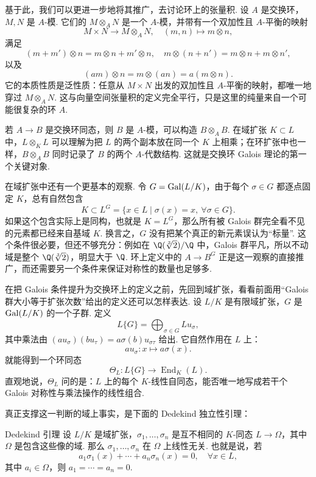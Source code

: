基于此，我们可以更进一步地将其推广，去讨论环上的张量积. 设 $A$ 是交换环，$M,N$ 是 $A$-模. 它们的 $M\otimes_A N$ 是一个 $A$-模，并带有一个双加性且 $A$-平衡的映射
\[
    M\times N\to M\otimes_A N,\quad (m,n)\mapsto m\otimes n,
\]
满足
\[
    (m+m')\otimes n=m\otimes n+m'\otimes n,\quad
    m\otimes(n+n')=m\otimes n+m\otimes n',
\]
以及
\[
    (am)\otimes n=m\otimes(an)=a(m\otimes n).
\]
它的本质性质是泛性质：任意从 $M\times N$ 出发的双加性且 $A$-平衡的映射，都唯一地穿过 $M\otimes_A N$. 这与向量空间张量积的定义完全平行，只是这里的纯量来自一个可能很复杂的环 $A$.

若 $A\to B$ 是交换环同态，则 $B$ 是 $A$-模，可以构造 $B\otimes_A B$. 在域扩张 $K\subset L$ 中，$L\otimes_K L$ 可以理解为把 $L$ 的两个副本放在同一个 $K$ 上相乘；在环扩张中也一样，$B\otimes_A B$ 同时记录了 $B$ 的两个 $A$-代数结构. 这就是交换环 Galois 理论的第一个关键对象.

在域扩张中还有一个更基本的观察. 令 $G=\operatorname{Gal}(L/K)$，由于每个 $\sigma\in G$ 都逐点固定 $K$，总有自然包含
\[
    K\subset L^G=\{x\in L\mid \sigma(x)=x,\ \forall\sigma\in G\}.
\]
如果这个包含实际上是同构，也就是 $K=L^G$，那么所有被 Galois 群完全看不见的元素都已经来自基域 $K$. 换言之，$G$ 没有把某个真正的新元素误认为``标量''. 这个条件很必要，但还不够充分：例如在 $\Q(\sqrt[3]{2})/\Q$ 中，Galois 群平凡，所以不动域是整个 $\Q(\sqrt[3]{2})$，明显大于 $\Q$. 环上定义中的 $A\to B^G$ 正是这一观察的直接推广，而还需要另一个条件来保证对称性的数量也足够多.

在把 Galois 条件提升为交换环上的定义之前，先回到域扩张，看看前面用``Galois 群大小等于扩张次数''给出的定义还可以怎样表达. 设 $L/K$ 是有限域扩张，$G$ 是 $\operatorname{Gal}(L/K)$ 的一个子群. 定义
\[
    L\{G\}=\bigoplus_{\sigma\in G}L u_\sigma,
\]
其中乘法由 $(a u_\sigma)(b u_\tau)=a\sigma(b)u_{\sigma\tau}$ 给出. 它自然作用在 $L$ 上：
\[
    a u_\sigma\colon x\mapsto a\sigma(x).
\]
就能得到一个环同态
\[
    \Theta_L\colon L\{G\}\to \operatorname{End}_K(L).
\]
直观地说，$\Theta_L$ 问的是：$L$ 上的每个 $K$-线性自同态，能否唯一地写成若干个 Galois 对称性与乘法操作的线性组合.

真正支撑这一判断的域上事实，是下面的 Dedekind 独立性引理：

\begin{lemma}{Dedekind 引理}{}
    设 $L/K$ 是域扩张，$\sigma_1,\ldots,\sigma_n$ 是互不相同的 $K$-同态 $L\to \Omega$，其中 $\Omega$ 是包含这些像的域. 那么 $\sigma_1,\ldots,\sigma_n$ 在 $\Omega$ 上线性无关. 也就是说，若
    \[
        a_1\sigma_1(x)+\cdots+a_n\sigma_n(x)=0,\quad \forall x\in L,
    \]
    其中 $a_i\in\Omega$，则 $a_1=\cdots=a_n=0$.
\end{lemma}

